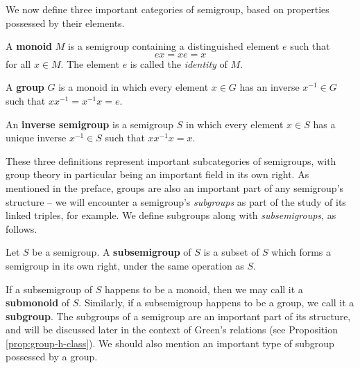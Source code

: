We now define three important categories of semigroup, based on properties
possessed by their elements.

\begin{definition}
  \label{def:monoid}
  A \textbf{monoid} $M$ is a semigroup containing a distinguished element $e$
  such that
  $$ex = xe = x$$
  for all $x \in M$.  The element $e$ is called the \textit{identity} of $M$.
\end{definition}

\begin{definition}
  \label{def:group}
  A \textbf{group} $G$ is a monoid in which every element $x \in G$ has an
  inverse $x^{-1} \in G$ such that $xx^{-1}=x^{-1}x = e$.
\end{definition}

\begin{definition}
  \label{def:inverse-semigroup}
  An \textbf{inverse semigroup} is a semigroup $S$ in which every element $x
  \in S$ has a unique inverse $x^{-1} \in S$ such that $xx^{-1}x=x$.
\end{definition}

These three definitions represent important subcategories of semigroups, with
group theory in particular being an important field in its own right.  As
mentioned in the preface, groups are also an important part of any semigroup's
structure -- we will encounter a semigroup's \textit{subgroups} as part of the
study of its linked triples, for example.  We define subgroups along with
\textit{subsemigroups}, as follows.

\begin{definition}
  \label{def:subsemigroup}
  Let $S$ be a semigroup.  A \textbf{subsemigroup} of $S$ is a subset of $S$
  which forms a semigroup in its own right, under the same operation as $S$.
\end{definition}

If a subsemigroup of $S$ happens to be a monoid, then we may call it a
\textbf{submonoid} of $S$.  Similarly, if a subsemigroup happens to be a group,
we call it a \textbf{subgroup}.  The subgroups of a semigroup are an important
part of its structure, and will be discussed later in the context of Green's
relations (see Proposition \ref{prop:group-h-class}).  We should also mention an
important type of subgroup possessed by a group.
 

